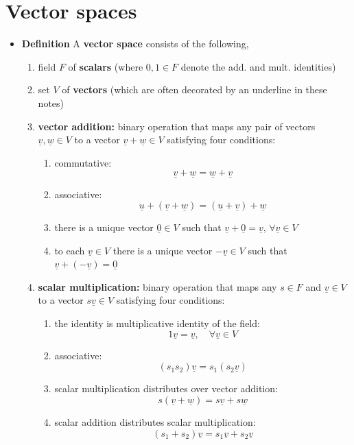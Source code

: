 \documentclass[11pt,twoside]{report}
\newcommand{\vecnot}{\underline}
\begin{document}
\section{Vector spaces}


\begin{itemize}
\item \textbf{Definition}  A \textbf{vector space} consists of the following,
\begin{enumerate}
\item field $F$ of \textbf{scalars} (where $0,1 \in F$ denote the add. and mult. identities)
\item  set $V$ of \textbf{vectors} (which are often decorated by an underline in these notes)
\item \textbf{vector addition:} binary operation that maps any pair of vectors $\vecnot{v}, \vecnot{w} \in V$ to a vector $\vecnot{v} + \vecnot{w} \in V$ satisfying four conditions:
\begin{enumerate}
\item commutative: 
\[
\vecnot{v} + \vecnot{w} = \vecnot{w} + \vecnot{v}
\]
\item associative: \[
\vecnot{u} + (\vecnot{v} + \vecnot{w}) = (\vecnot{u} + \vecnot{v}) + \vecnot{w}
\]
\item there is a unique vector $\vecnot{0} \in V$ such that $\vecnot{v} + \vecnot{0} = \vecnot{v}$, $\forall \vecnot{v} \in V$
\item to each $\vecnot{v} \in V$ there is a unique vector $- \vecnot{v} \in V$ such that $\vecnot{v} + (- \vecnot{v}) = \vecnot{0}$
\end{enumerate}
\item \textbf{scalar multiplication:} binary operation that maps any $s \in F$ and $\vecnot{v} \in V$ to a vector $s \vecnot{v} \in V$ satisfying four conditions:
\begin{enumerate}
\item the identity is multiplicative identity of the field: 
\[
1 \vecnot{v} = \vecnot{v}, \quad \forall \vecnot{v} \in V
\]
\item  associative: 
\[
(s_1 s_2) \vecnot{v} = s_1 ( s_2 \vecnot{v} )
\]
\item scalar multiplication distributes over vector addition: 
\[
s ( \vecnot{v} + \vecnot{w} ) = s \vecnot{v} + s \vecnot{w}
\]
\item scalar addition distributes scalar multiplication: 
\[
(s_1 + s_2) \vecnot{v} = s_1 \vecnot{v} + s_2 \vecnot{v}
\]
\end{enumerate}
\end{enumerate}


\end{itemize}
\end{document}

